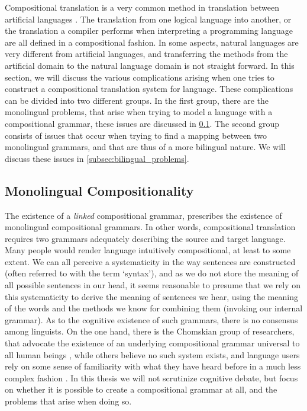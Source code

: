 Compositional translation is a very common method in translation between artificial languages \citep{janssen1996compositionality,janssen1998algebraic}. The translation from one logical language into another, or the translation a compiler performs when interpreting a programming language are all defined in a compositional fashion. In some aspects, natural languages are very different from artificial languages, and transferring the methods from the artificial domain to the natural language domain is not straight forward. In this section, we will discuss the various complications arising when one tries to construct a compositional translation system for language. These complications can be divided into two different groups. In the first group, there are the monolingual problems, that arise when trying to model a language with a compositional grammar, these issues are discussed in \ref{subsec:monolingual_problems}. The second group consists of issues that occur when trying to find a mapping between two monolingual grammars, and that are thus of a more bilingual nature. We will discuss these issues in \ref{subsec:bilingual_problems}.

\subsection{Monolingual Compositionality}
\label{subsec:monolingual_problems}

The existence of a \textit{linked} compositional grammar, prescribes the existence of monolingual compositional grammars. In other words, compositional translation requires two grammars adequately describing the source and target language. Many people would render language intuitively compositional, at least to some extent. We can all perceive a systematicity in the way sentences are constructed (often referred to with the term `syntax'), and as we do not store the meaning of all possible sentences in our head, it seems reasonable to presume that we rely on this systematicity to derive the meaning of sentences we hear, using the meaning of the words and the methods we know for combining them (invoking our internal grammar). As to the cognitive existence of such grammars, there is no consensus among linguists. On the one hand, there is the Chomskian group of researchers, that advocate the existence of an underlying compositional grammar universal to all human beings \citep[as first claimed in][]{chomsky1956three}, while others believe no such system exists, and language users rely on some sense of familiarity with what they have heard before in a much less complex fashion \citep[quite recently, e.g.,][]{frank2012hierarchical}. In this thesis we will not scrutinize cognitive debate, but focus on whether it is possible to create a compositional grammar at all, and the problems that arise when doing so.

